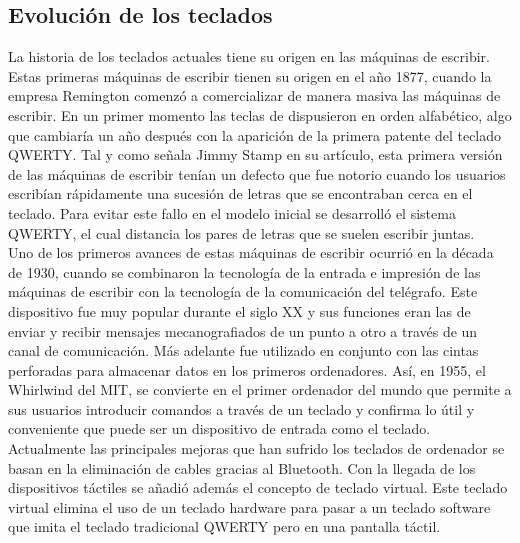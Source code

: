 
\subsection{Evoluci\'on de los teclados}

La historia de los teclados\cite{historiateclados} actuales tiene su origen en las m\'aquinas de escribir. Estas primeras m\'aquinas de escribir tienen su origen en el a\~no 1877, cuando la empresa Remington comenz\'o a comercializar de manera masiva las m\'aquinas de escribir. En un primer momento las teclas de dispusieron en orden alfab\'etico, algo que cambiar\'ia un a\~no despu\'es con la aparici\'on de la primera patente del teclado QWERTY. Tal y como se\~nala Jimmy Stamp\cite{jimmy} en su art\'iculo, esta primera versi\'on de las m\'aquinas de escribir ten\'ian un defecto que fue notorio cuando los usuarios escrib\'ian r\'apidamente una sucesi\'on de letras que se encontraban cerca en el teclado. Para evitar este fallo en el modelo inicial se desarroll\'o el sistema QWERTY, el cual distancia los pares de letras que se suelen escribir juntas.\\

Uno de los primeros avances de estas m\'aquinas de escribir ocurri\'o en la d\'ecada de 1930, cuando se combinaron la tecnolog\'ia de la entrada e impresi\'on de las m\'aquinas de escribir con la tecnolog\'ia de la comunicaci\'on del tel\'egrafo. Este dispositivo fue muy popular durante el siglo XX y sus funciones eran las de enviar y recibir mensajes mecanografiados de un punto a otro a trav\'es de un canal de comunicaci\'on. M\'as adelante fue utilizado en conjunto con las cintas perforadas para almacenar datos en los primeros ordenadores. As\'i, en 1955, el Whirlwind del MIT, se convierte en el primer ordenador del mundo que permite a sus usuarios introducir comandos a trav\'es de un teclado y confirma lo \'util y conveniente que puede ser un dispositivo de entrada como el teclado.\\

Actualmente las principales mejoras que han sufrido los teclados de ordenador se basan en la eliminaci\'on de cables gracias al Bluetooth. Con la llegada de los dispositivos t\'actiles se a\~nadi\'o adem\'as el concepto de teclado virtual. Este teclado virtual elimina el uso de un teclado hardware para pasar a un teclado software que imita el teclado tradicional QWERTY pero en una pantalla t\'actil. \\

